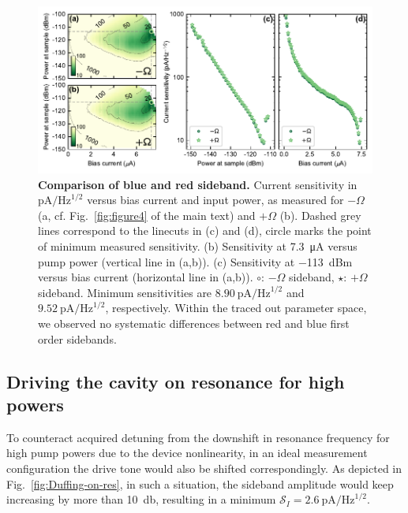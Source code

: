 \begin{figure}
	\centering
	\includegraphics[width=\linewidth]{chapter-currentdetection/figures/SM_plusminus}
	\caption{
		\textbf{Comparison of blue and red sideband.}
		Current sensitivity in $\si{\pico\ampere\per\hertz\tothe{1/2}}$ versus bias current and input power, as measured for $-\Omega$ (a, cf. Fig.~\ref{fig:figure4} of the main text) and $+\Omega$ (b).
		Dashed grey lines correspond to the linecuts in (c) and (d), circle marks the point of minimum measured sensitivity.
		(b) Sensitivity at \SI{7.3}{\micro\ampere} versus pump power (vertical line in (a,b)).
		(c) Sensitivity at \SI{-113}{dBm} versus bias current (horizontal line in (a,b)).
		$\circ$: $-\Omega$ sideband, $\star$: $+\Omega$ sideband.
		Minimum sensitivities are $\SI{8.90}{\pico\ampere\per\hertz\tothe{1/2}}$ and $\SI{9.52}{\pico\ampere\per\hertz\tothe{1/2}}$, respectively.
		Within the traced out parameter space, we observed no systematic differences between red and blue first order sidebands.
	}
	\label{fig:plusminus}
\end{figure}


\subsection{Driving the cavity on resonance for high powers}\label{sec:drive_shift}
To counteract acquired detuning from the downshift in resonance frequency for high pump powers due to the device nonlinearity, in an ideal measurement configuration the drive tone would also be shifted correspondingly.
% 
As depicted in Fig.~\ref{fig:Duffing-on-res}, in such a situation, the sideband amplitude would keep increasing by more than \SI{10}{\decibel}, resulting in a minimum $\mathcal{S}_I=\SI{2.6}{\pico\ampere\per\hertz\tothe{1/2}}$.

